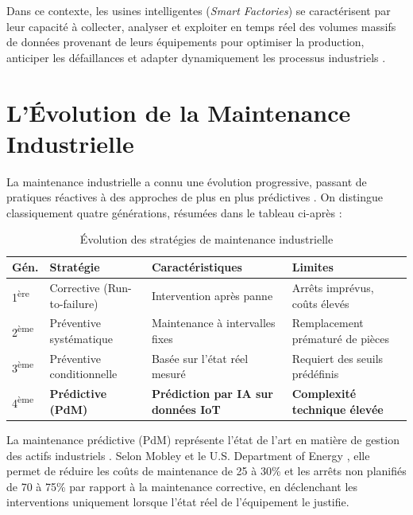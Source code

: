 \documentclass[12pt, a4paper, oneside]{report}
\begin{document}
Dans ce contexte, les usines intelligentes (\textit{Smart Factories}) se caractérisent par leur
capacité à collecter, analyser et exploiter en temps réel des volumes massifs de données provenant
de leurs équipements pour optimiser la production, anticiper les défaillances et adapter
dynamiquement les processus industriels \cite{hermann2016, schwab2016}.

\section{L'Évolution de la Maintenance Industrielle}

La maintenance industrielle a connu une évolution progressive, passant de pratiques réactives à
des approches de plus en plus prédictives \cite{mobley2002}. On distingue classiquement quatre
générations, résumées dans le tableau ci-après :

\begin{table}[H]
  \centering
  \begin{tabularx}{\textwidth}{C{1.5cm} L{3cm} L{4cm} L{4.5cm}}
    \toprule
    \textbf{Gén.} &
    \textbf{Stratégie} &
    \textbf{Caractéristiques} &
    \textbf{Limites} \\
    \midrule
    1\textsuperscript{ère} & Corrective (Run-to-failure) & Intervention après panne & Arrêts imprévus, coûts élevés \\
    2\textsuperscript{ème} & Préventive systématique & Maintenance à intervalles fixes & Remplacement prématuré de pièces \\
    3\textsuperscript{ème} & Préventive conditionnelle & Basée sur l'état réel mesuré & Requiert des seuils prédéfinis \\
    4\textsuperscript{ème} & \textbf{Prédictive (PdM)} & \textbf{Prédiction par IA sur données IoT} & \textbf{Complexité technique élevée} \\
    \bottomrule
  \end{tabularx}
  \caption{Évolution des stratégies de maintenance industrielle}
\end{table}

La maintenance prédictive (PdM) représente l'état de l'art en matière de gestion des actifs
industriels \cite{benhanifia2025}. Selon Mobley \cite{mobley2002} et le U.S. Department of Energy \cite{doe2010}, elle permet de réduire les
coûts de maintenance de 25 à 30\% et les arrêts non planifiés de 70 à 75\% par rapport à la
maintenance corrective, en déclenchant les interventions uniquement lorsque l'état réel
de l'équipement le justifie.
\end{document}
